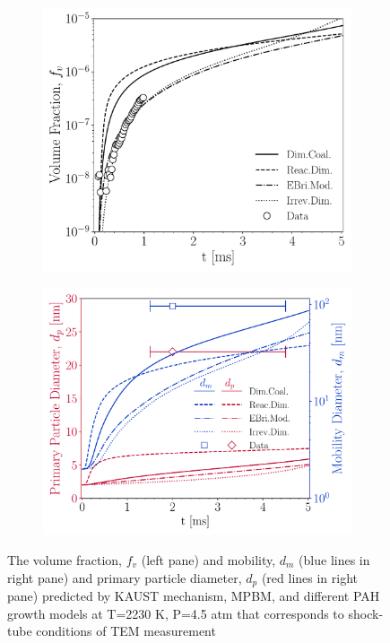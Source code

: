 \begin{figure}[H]
	\centering
	\begin{subfigure}[t]{0.3\textwidth}
		\includegraphics[width=1\textwidth]{Figures/Results/Shocktube/Stanford/TEM/vf_TEM.pdf}
	\end{subfigure}
	\begin{subfigure}[t]{0.32\textwidth}
		\includegraphics[width=1\textwidth]{Figures/Results/Shocktube/Stanford/TEM/dp_dm_TEM.pdf}
	\end{subfigure}
	\caption{The volume fraction, $f_v$ (left pane) and mobility, $d_m$ (blue lines in right pane) and primary particle diameter, $d_p$ (red lines in right pane) predicted by KAUST mechanism, MPBM, and different PAH growth models at T=2230 K, P=4.5 atm that corresponds to shock-tube conditions of TEM measurement}
	\label{fig:shocktube_TEM_fvdd} 
\end{figure}

